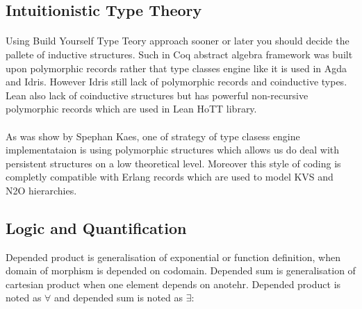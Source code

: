 \documentclass[11pt,oneside]{article}
\begin{document}



\newpage
   \subsection{Intuitionistic Type Theory}

   \paragraph{}
   Using Build Yourself Type Teory approach sooner or later
   you should decide the pallete of inductive structures. Such in Coq
   abstract algebra framework was built upon polymorphic records\cite{coqalg} rather
   that type classes engine like it is used in Agda and Idris. However
   Idris still lack of polymorphic records and coinductive types. Lean also
   lack of coinductive structures but has powerful non-recursive polymorphic records
   which are used in Lean HoTT library.

   \paragraph{}
   As was show by Spephan Kaes\cite{kaes}, one of strategy of type clasess engine
   implementataion is using polymorphic structures which allows us do deal with
   persistent structures on a low theoretical level. Moreover this style of coding
   is completly compatible with Erlang records which are used to model KVS and N2O hierarchies.

  \subsection{Logic and Quantification}

  Depended product is generalisation of exponential or function definition, when domain of morphism is depended on codomain.
  Depended sum is generalisation of cartesian product when one element depends on anotehr.
  Depended product is noted as $\forall$ and depended sum is noted as $\exists$:
\end{document}
